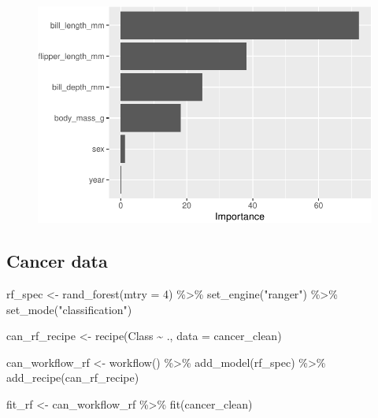 \documentclass[
  letterpaper,
  DIV=11,
  numbers=noendperiod]{scrreprt}
\newenvironment{Shaded}{\begin{snugshade}}{\end{snugshade}}
\newcommand{\AttributeTok}[1]{\textcolor[rgb]{0.40,0.45,0.13}{#1}}
\newcommand{\DecValTok}[1]{\textcolor[rgb]{0.68,0.00,0.00}{#1}}
\newcommand{\FunctionTok}[1]{\textcolor[rgb]{0.28,0.35,0.67}{#1}}
\newcommand{\NormalTok}[1]{\textcolor[rgb]{0.00,0.23,0.31}{#1}}
\newcommand{\OtherTok}[1]{\textcolor[rgb]{0.00,0.23,0.31}{#1}}
\newcommand{\SpecialCharTok}[1]{\textcolor[rgb]{0.37,0.37,0.37}{#1}}
\newcommand{\StringTok}[1]{\textcolor[rgb]{0.13,0.47,0.30}{#1}}
\begin{document}
\begin{figure}[H]

{\centering \includegraphics{./14-machine-learning_files/figure-pdf/unnamed-chunk-18-1.pdf}

}

\end{figure}

\hypertarget{cancer-data}{%
\subsection{Cancer data}\label{cancer-data}}

\begin{Shaded}
\begin{Highlighting}[]
\NormalTok{rf\_spec }\OtherTok{\textless{}{-}} \FunctionTok{rand\_forest}\NormalTok{(}\AttributeTok{mtry =} \DecValTok{4}\NormalTok{) }\SpecialCharTok{\%\textgreater{}\%}
  \FunctionTok{set\_engine}\NormalTok{(}\StringTok{"ranger"}\NormalTok{) }\SpecialCharTok{\%\textgreater{}\%}
  \FunctionTok{set\_mode}\NormalTok{(}\StringTok{"classification"}\NormalTok{)}
\end{Highlighting}
\end{Shaded}

\begin{Shaded}
\begin{Highlighting}[]
\NormalTok{can\_rf\_recipe }\OtherTok{\textless{}{-}} 
  \FunctionTok{recipe}\NormalTok{(Class }\SpecialCharTok{\textasciitilde{}}\NormalTok{ ., }\AttributeTok{data =}\NormalTok{ cancer\_clean) }

\NormalTok{can\_workflow\_rf }\OtherTok{\textless{}{-}} \FunctionTok{workflow}\NormalTok{() }\SpecialCharTok{\%\textgreater{}\%}
  \FunctionTok{add\_model}\NormalTok{(rf\_spec) }\SpecialCharTok{\%\textgreater{}\%}
  \FunctionTok{add\_recipe}\NormalTok{(can\_rf\_recipe)}

\NormalTok{fit\_rf }\OtherTok{\textless{}{-}}\NormalTok{ can\_workflow\_rf  }\SpecialCharTok{\%\textgreater{}\%} 
  \FunctionTok{fit}\NormalTok{(cancer\_clean)}
\end{Highlighting}
\end{Shaded}
\end{document}
